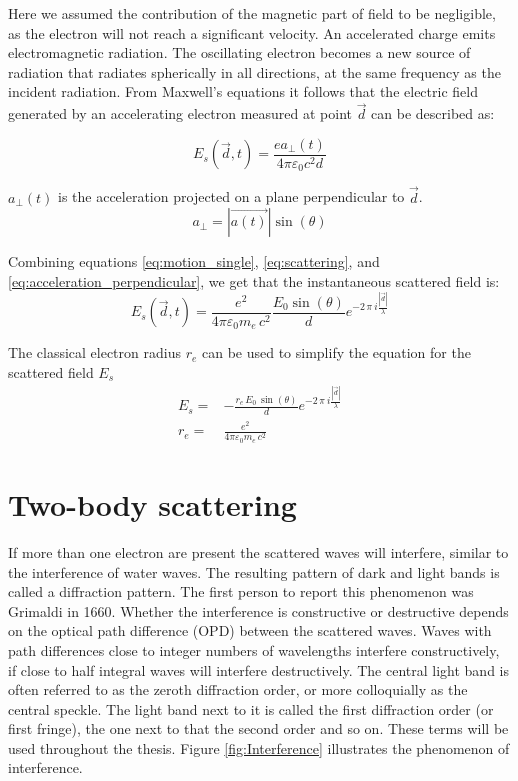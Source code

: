 Here we assumed the contribution of the magnetic part of field to be negligible, as the electron will not reach a significant velocity.
An accelerated charge emits electromagnetic radiation. The oscillating electron becomes a new source of radiation that radiates spherically in all directions, at the same frequency as the incident radiation. From Maxwell's equations it follows that the electric field generated by an accelerating electron measured at point $\vec{d}$  can be described as:

\begin{equation}\label{eq:scattering}
{E_s}(\vec{d},t) = \frac{e a_\perp(t)}{4 \pi \varepsilon_0c^2d}
\end{equation}

$a_{\perp}(t)$ is the acceleration projected on a plane perpendicular to $\vec{d}$. 
\begin{equation}\label{eq:acceleration_perpendicular}
a_\perp = |\vec{a(t)}|\sin(\theta)
\end{equation}

Combining equations \ref{eq:motion_single}, \ref{eq:scattering}, and \ref{eq:acceleration_perpendicular}, we get that the instantaneous scattered field is:
\begin{equation}
E_s(\vec{d},t) = \frac{{e}^2}{4 \pi \varepsilon_0 m_e\,c^2} \frac{E_0 \sin(\theta)}{d} e^{-2\,\pi\ i \frac{|\vec{d}|}{\lambda}}
\end{equation}

The classical electron radius $r_e$ can be used to simplify the equation for the scattered field $E_s$
\begin{align*}
E_s=& - \frac{r_e\,E_0\,\sin(\theta)}{d} e^{-2\,\pi\ i \frac{|\vec{d}|}{\lambda}}\\
r_e =& \frac{e^2}{4 \pi \varepsilon_0 m_e\,c^2}    
\end{align*}


\section{Two-body scattering}
If more than one electron are present the scattered waves will interfere, similar to the interference of water waves. The resulting pattern of dark and light bands is called a diffraction pattern. The first person to report this phenomenon was Grimaldi in 1660. Whether the interference is constructive or destructive depends on the optical path difference (OPD) between the scattered waves. Waves with path differences close to integer numbers of wavelengths interfere constructively, if close to half integral waves will interfere destructively. The central light band is often referred to as the zeroth diffraction order, or more colloquially as the central speckle. The light band next to it is called the first diffraction order (or first fringe), the one next to that the second order and so on. These terms will be used throughout the thesis. Figure \ref{fig:Interference} illustrates the phenomenon of interference.

